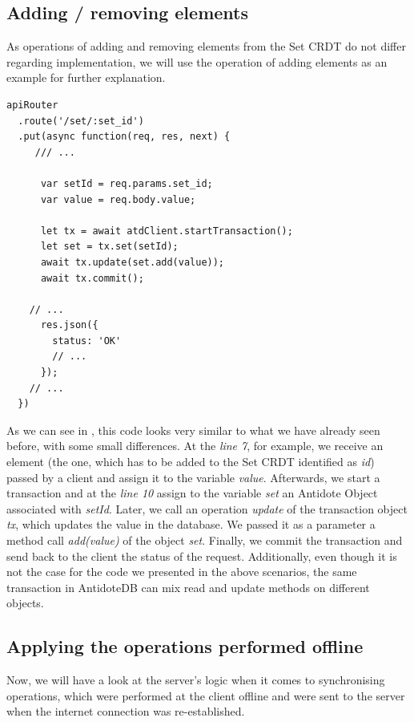 \subsection*{Adding / removing elements}

As operations of adding and removing elements from the Set CRDT do not differ regarding implementation, we will use the operation of adding elements as an example for further explanation.

\begin{lstlisting}[caption={Code for applying an \textit{add} operation to a Set CRDT.}, label={lst:dev2}]
apiRouter
  .route('/set/:set_id')
  .put(async function(req, res, next) {
     /// ...

      var setId = req.params.set_id;
      var value = req.body.value;      

      let tx = await atdClient.startTransaction();
      let set = tx.set(setId);
      await tx.update(set.add(value));
      await tx.commit();

    // ...
      res.json({
        status: 'OK'
        // ...
      });
    // ...
  })
\end{lstlisting} 

As we can see in , this code looks very similar to what we have already seen before, with some small differences. At the \textit{line 7}, for example, we receive an element (the one, which has to be added to the Set CRDT identified as \textit{id}) passed by a client and assign it to the variable \textit{value}. Afterwards, we start a transaction and at the \textit{line 10} assign to the variable \textit{set} an Antidote Object associated with \textit{setId}. Later, we call an operation \textit{update} of the transaction object \textit{tx}, which updates the value in the database. We passed it as a parameter a method call \textit{add(value)} of the object \textit{set}. Finally, we commit the transaction and send back to the client the status of the request. Additionally, even though it is not the case for the code we presented in the above scenarios, the same transaction in AntidoteDB can mix read and update methods on different objects.

\subsection*{Applying the operations performed offline}

Now, we will have a look at the server's logic when it comes to synchronising operations, which were performed at the client offline and were sent to the server when the internet connection was re-established.

